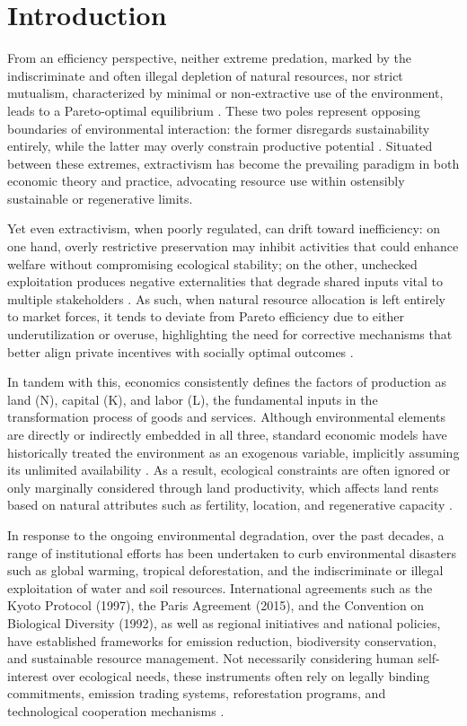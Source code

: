 
\section{Introduction}

From an efficiency perspective, neither extreme predation, marked by the indiscriminate and often illegal depletion of natural resources, nor strict mutualism, characterized by minimal or non-extractive use of the environment, leads to a Pareto-optimal equilibrium \cite{dasgupta2001human}. These two poles represent opposing boundaries of environmental interaction: the former disregards sustainability entirely, while the latter may overly constrain productive potential \cite{ostrom1990commons}. Situated between these extremes, extractivism has become the prevailing paradigm in both economic theory and practice, advocating resource use within ostensibly sustainable or regenerative limits. 

Yet even extractivism, when poorly regulated, can drift toward inefficiency: on one hand, overly restrictive preservation may inhibit activities that could enhance welfare without compromising ecological stability; on the other, unchecked exploitation produces negative externalities that degrade shared inputs vital to multiple stakeholders \cite{chichilnisky2017north}. As such, when natural resource allocation is left entirely to market forces, it tends to deviate from Pareto efficiency due to either underutilization or overuse, highlighting the need for corrective mechanisms that better align private incentives with socially optimal outcomes \cite{hanley2007environmental}.

In tandem with this, economics consistently defines the factors of production as land (N), capital (K), and labor (L), the fundamental inputs in the transformation process of goods and services. Although environmental elements are directly or indirectly embedded in all three, standard economic models have historically treated the environment as an exogenous variable, implicitly assuming its unlimited availability \cite{jehle2011}. As a result, ecological constraints are often ignored or only marginally considered through land productivity, which affects land rents based on natural attributes such as fertility, location, and regenerative capacity \cite{article}.

In response to the ongoing environmental degradation, over the past decades, a range of institutional efforts has been undertaken to curb environmental disasters such as global warming, tropical deforestation, and the indiscriminate or illegal exploitation of water and soil resources. International agreements such as the Kyoto Protocol (1997), the Paris Agreement (2015), and the Convention on Biological Diversity (1992), as well as regional initiatives and national policies, have established frameworks for emission reduction, biodiversity conservation, and sustainable resource management. Not necessarily considering human self-interest over ecological needs, these instruments often rely on legally binding commitments, emission trading systems, reforestation programs, and technological cooperation mechanisms \cite{easterly2013tyranny}.

